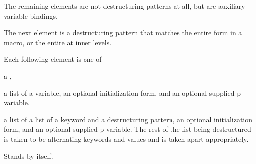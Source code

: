 
The remaining elements are not destructuring patterns at all, but are
auxiliary variable bindings.  
 

The next element is a destructuring pattern that matches the entire
form in a macro, or the entire  at inner levels.
 

Each following element is one of
\beginlist

\itemitem{}
 a ,

 a list of a variable,
           an optional initialization form,
       and an optional supplied-p variable.

 a list of a list of a keyword and a destructuring pattern,
           an optional initialization form,
       and an optional supplied-p variable.
\endlist
The rest of the list being destructured
is taken to be alternating keywords and values and is taken apart appropriately.
 

Stands by itself.
\endlist 
 
\endsubsubsubsection%





\endsubsubsection%

